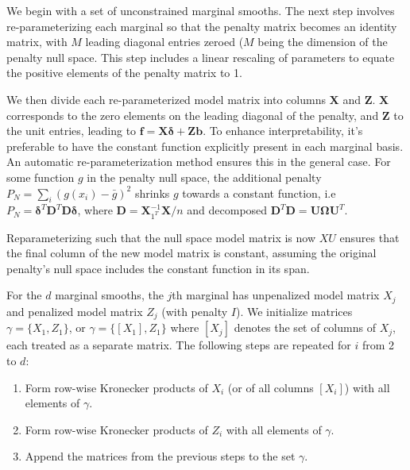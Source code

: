 \documentclass[12pt, twoside,hidelinks]{article}
\theoremstyle{definition}
\numberwithin{equation}{section}
\begin{document}
We begin with a set of unconstrained marginal smooths. The next step involves re-parameterizing each marginal so that the penalty matrix becomes an identity matrix, with \( M \) leading diagonal entries zeroed (\( M \) being the dimension of the penalty null space. This step includes a linear rescaling of parameters to equate the positive elements of the penalty matrix to 1.
\newline

We then divide each re-parameterized model matrix into columns \( \mathbf{X} \) and \( \mathbf{Z} \). \( \mathbf{X} \) corresponds to the zero elements on the leading diagonal of the penalty, and \( \mathbf{Z} \) to the unit entries, leading to \( \boldsymbol{f} = \mathbf{X} \boldsymbol{\delta} + \mathbf{Z}\boldsymbol{b} \). To enhance interpretability, it's preferable to have the constant function explicitly present in each marginal basis. An automatic re-parameterization method ensures this in the general case. For some function \( g \) in the penalty null space, the additional penalty \( P_N = \sum_i (g(x_i) - \bar{g})^2 \) shrinks \( g \) towards a constant function, i.e \( P_N = \boldsymbol{\delta}^T \mathbf{D}^T \mathbf{D} \boldsymbol{\delta} \), where \( \mathbf{D} = \mathbf{X}^{-1}_{1^T} \mathbf{X}/n \) and decomposed \( \mathbf{D}^T \mathbf{D} = \mathbf{U} \mathbf{\Omega} \mathbf{U}^T \).
\newline

Reparameterizing such that the null space model matrix is now \( XU \) ensures that the final column of the new model matrix is constant, assuming the original penalty's null space includes the constant function in its span.

For the \( d \) marginal smooths, the \( j \)th marginal has unpenalized model matrix \( X_j \) and penalized model matrix \( Z_j \) (with penalty \( I \)). We initialize matrices \( \gamma = \{X_1, Z_1\} \), or \( \gamma = \{[X_1], Z_1\} \) where \( [X_j] \) denotes the set of columns of \( X_j \), each treated as a separate matrix. The following steps are repeated for \( i \) from 2 to \( d \):

\begin{enumerate}
    \item Form row-wise Kronecker products of \( X_i \) (or of all columns \( [X_i] \)) with all elements of \( \gamma \).
    \item Form row-wise Kronecker products of \( Z_i \) with all elements of \( \gamma \).
    \item Append the matrices from the previous steps to the set \( \gamma \).
\end{enumerate}
\end{document}

